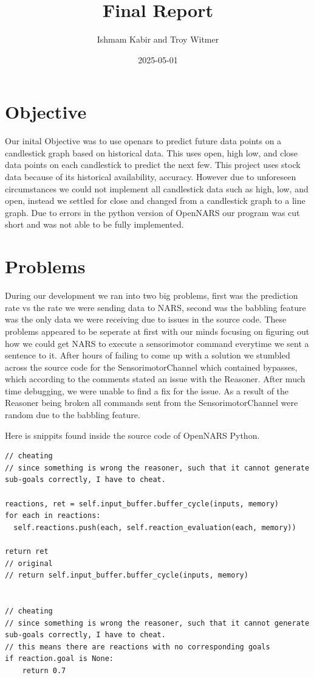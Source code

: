 \documentclass{article}
\title{Final Report}
\author{Ishmam Kabir and Troy Witmer}
\date{2025-05-01}
\begin{document}
\maketitle

\section{Objective}
Our inital Objective was to use openars to predict future data points on a candlestick graph based
on historical data.
This uses open, high low, and close data points on each candlestick to predict the next few.
This project uses stock data because of its historical availability, accuracy.
However due to unforeseen circumstances we could not implement all candlestick
data such as high, low, and open, instead we settled for close and changed from a
candlestick graph to a line graph. Due to errors in the python version of OpenNARS our
program was cut short and was not able to be fully implemented.

\section{Problems}

During our development we ran into two big problems, first was the prediction rate vs
the rate we were sending data to NARS, second was the babbling feature was the only
data we were receiving due to issues in the source code. These problems appeared to
be seperate at first with our minds focusing on figuring out how we could get NARS to
execute a sensorimotor command everytime we sent a sentence to it. After hours of
failing to come up with a solution we stumbled across the source code for the SensorimotorChannel
which contained bypasses, which according to the comments stated an issue with the Reasoner.
After much time debugging, we were unable to find a fix for the issue. As a result of
the Reasoner being broken all commands sent from the SensorimotorChannel were random due
to the babbling feature.

\vspace{3mm}
Here is snippits found inside the source code of OpenNARS Python.

\begin{lstlisting}[style=Pseudocode, mathescape=true]
// cheating
// since something is wrong the reasoner, such that it cannot generate sub-goals correctly, I have to cheat.

reactions, ret = self.input_buffer.buffer_cycle(inputs, memory)
for each in reactions:
  self.reactions.push(each, self.reaction_evaluation(each, memory))

return ret
// original
// return self.input_buffer.buffer_cycle(inputs, memory)


// cheating
// since something is wrong the reasoner, such that it cannot generate sub-goals correctly, I have to cheat.
// this means there are reactions with no corresponding goals
if reaction.goal is None:
    return 0.7

\end{lstlisting}
\end{document}
